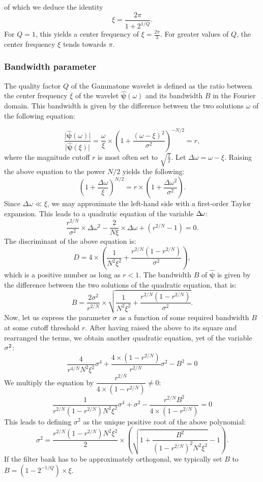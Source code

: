 \documentclass[smallextended]{svjour3}
\begin{document}
of which we deduce the identity
\[
\xi=\dfrac{2\pi}{1+2^{1/Q}}.
\]
For $Q=1$, this yields a center frequency of $\xi=\frac{2\pi}{3}$.
For greater values of $Q$, the center frequency $\xi$ tends towards
$\pi$.


\subsubsection*{Bandwidth parameter}

The quality factor $Q$ of the Gammatone wavelet is defined as the
ratio between the center frequency $\xi$ of the wavelet $\boldsymbol{\hat{\psi}}(\omega)$
and its bandwidth $B$ in the Fourier domain. This bandwidth is given
by the difference between the two solutions $\omega$ of the following
equation:

\[
\dfrac{\vert\boldsymbol{\hat{\psi}}(\omega)\vert}{\vert\boldsymbol{\hat{\psi}}(\xi)\vert}=\dfrac{\omega}{\xi}\times\left(1+\dfrac{\left(\omega-\xi\right)^{2}}{\sigma^{2}}\right)^{-N/2}=r,
\]
where the magnitude cutoff $r$ is most
often set to $\sqrt{\frac{1}{2}}$. Let $\Delta\omega=\omega-\xi$.
Raising the above equation to the power $N/2$ yields the following:
\[
\left(1+\dfrac{\Delta\omega}{\xi}\right)^{N/2}=r\times\left(1+\frac{\Delta\omega^{2}}{\sigma^{2}}\right).
\]
Since $\Delta\omega\ll\xi$, we may approximate the left-hand side
with a first-order Taylor expansion. This leads to a quadratic equation
of the variable $\Delta\negmedspace\omega$:
\[
\dfrac{r^{2/N}}{\sigma^{2}}\times\Delta\omega^{2}-\dfrac{2}{N\xi}\times\Delta\omega+\left(r^{2/N}-1\right)=0.
\]
The discriminant of the above equation is:
\[
D=4\times\left(\dfrac{1}{N^{2}\xi^{2}}+\dfrac{r^{2/N}\left(1-r^{2/N}\right)}{\sigma^{2}}\right),
\]
which is a positive number as long as $r<1$. The bandwidth $B$ of
$\boldsymbol{\hat{\psi}}$ is given by the difference between the
two solutions of the quadratic equation, that is:
\[
B=\dfrac{2\sigma^{2}}{r^{2/N}}\times\sqrt{\dfrac{1}{N^{2}\xi^{2}}+\dfrac{r^{2/N}\left(1-r^{2/N}\right)}{\sigma^{2}}}.
\]
Now, let us express the parameter $\sigma$ as a function of some
required bandwidth $B$ at some cutoff threshold $r$. After having
raised the above to its square and rearranged the terms, we obtain
another quadratic equation, yet of the variable $\mbox{\ensuremath{\sigma}}^{2}$:
\[
\dfrac{4}{r^{4/N}N^{2}\xi^{2}}\sigma^{4}+\dfrac{4\times\left(1-r^{2/N}\right)}{r^{2/N}}\sigma^{2}-B^{2}=0
\]
We multiply the equation by $\dfrac{r^{2/N}}{4\times\left(1-r^{2/N}\right)}\neq0:$
\[
\dfrac{1}{r^{2/N}\left(1-r^{2/N}\right)N^{2}\xi^{2}}\sigma^{4}+\sigma^{2}-\dfrac{r^{2/N}B^{2}}{4\times\left(1-r^{2/N}\right)}=0
\]
This leads to defining $\sigma^{2}$ as the unique positive root of
the above polynomial:
\[
\sigma^{2}=\dfrac{r^{2/N}\left(1-r^{2/N}\right)N^{2}\xi^{2}}{2}\times\left(\sqrt{1+\dfrac{B^{2}}{\left(1-r^{2/N}\right)^{2}N^{2}\xi^{2}}}-1\right).
\]
If the filter bank has to be approximately orthogonal, we typically
set $B$ to $B=\left(1-2^{-1/Q}\right)\times\xi$.
\end{document}
